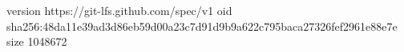 version https://git-lfs.github.com/spec/v1
oid sha256:48da11e39ad3d86eb59d00a23c7d91d9b9a622c795baca27326fef2961e88e7e
size 1048672
